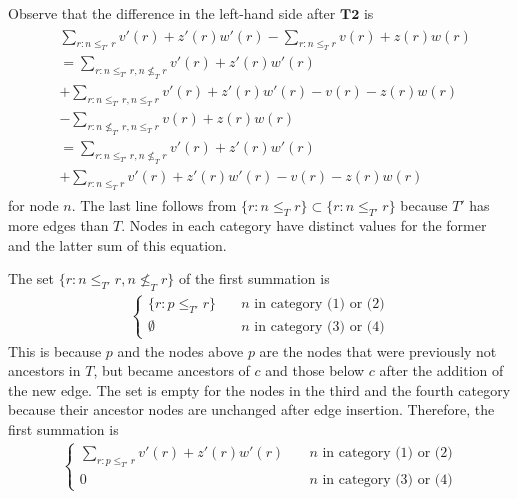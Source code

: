 Observe that the difference in the left-hand side after $\mathbf{T2}$ is
\begin{align}
    \begin{aligned}
        &\sum_{r:n \le_{T'} r} v'(r) + z'(r)w'(r) 
        - \sum_{r:n \le_{T} r} v(r) + z(r)w(r)
        \\
        &= \sum_{r: n\le_{T'}r, n \nleq_T r } v'(r) + z'(r)w'(r) \\
        &+ \sum_{r: n \le_{T'} r, n\le_T r} v'(r)+z'(r)w'(r)-v(r)-z(r)w(r) \\
        &- \sum_{r: n \nleq_{T'} r, n\le_T r} v(r) + z(r)w(r) \\
        &=  \sum_{r: n\le_{T'}r, n \nleq_T r } v'(r) + z'(r)w'(r)\\
        &+ \sum_{r: n\le_T r} v'(r)+z'(r)w'(r)-v(r)-z(r)w(r)
    \end{aligned}
    \label{preserve_split}
\end{align}
for node $n$.
The last line follows from $\{r: n \le_T r \} \subset \{r: n\le_{T'} r\}$ because $T'$ has more edges than $T$.
Nodes in each category have distinct values for the former and the latter sum of this equation.

The set $\{r: n \le_{T'} r, n \nleq_T r\}$ of the first summation is
\begin{align}
    \begin{cases}
         \{r: p \le_{T'} r\} & \quad \text{$n$ in category (1) or (2)} \\
        \emptyset & \quad \text{$n$ in category (3) or (4)}
    \end{cases}
\end{align}
This is because $p$ and the nodes above $p$ are the nodes that were previously not ancestors in $T$, but became ancestors of $c$ and those below $c$ after the addition of the new edge.
The set is empty for the nodes in the third and the fourth category because their ancestor nodes are unchanged after edge insertion.
Therefore, the first summation is
\begin{align}
    \begin{cases}
        \sum_{r: p \le_{T'} r} v'(r) + z'(r)w'(r) & \quad \text{$n$ in category (1) or (2)} \\
        0 & \quad \text{$n$ in category (3) or (4)}
    \end{cases}
\end{align}

